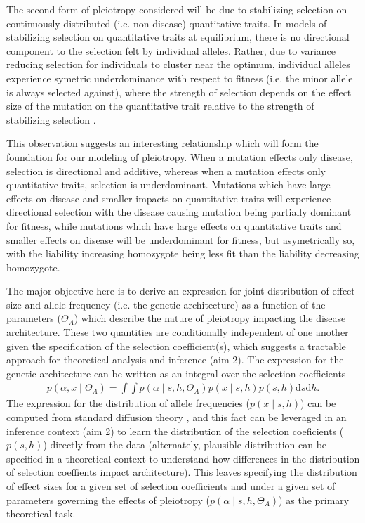 \documentclass[11pt]{article}
\begin{document}
The second form of pleiotropy considered will be due to stabilizing selection on continuously distributed (i.e. non-disease) quantitative traits. In models of stabilizing selection on quantitative traits at equilibrium, there is no directional component to the selection felt by individual alleles. Rather, due to variance reducing selection for individuals to cluster near the optimum, individual alleles experience symetric underdominance with respect to fitness (i.e. the minor allele is always selected against), where the strength of selection depends on the effect size of the mutation on the quantitative trait relative to the strength of stabilizing selection \cite{Robertson:1956dk}.

This observation suggests an interesting relationship which will form the foundation for our modeling of pleiotropy. When a mutation effects only disease, selection is directional and additive, whereas when a mutation effects only quantitative traits, selection is underdominant. Mutations which have large effects on disease and smaller impacts on quantitative traits will experience directional selection with the disease causing mutation being partially dominant for fitness, while mutations which have large effects on quantitative traits and smaller effects on disease will be underdominant for fitness, but asymetrically so, with the liability increasing homozygote being less fit than the liability decreasing homozygote.

The major objective here is to derive an expression for joint distribution of effect size and allele frequency (i.e. the genetic architecture) as a function of the parameters ($\Theta_A$) which describe the nature of pleiotropy impacting the disease architecture. These two quantities are conditionally independent of one another given the specification of the selection coefficient(s), which suggests a tractable approach for theoretical analysis and inference (aim 2). The expression for the genetic architecture can be written as an integral over the selection coefficients
\begin{align}
  p\left(\alpha,x \mid \Theta_A\right) = \int \int p\left(\alpha \mid s,h,\Theta_A\right) p\left(x \mid s,h \right) p\left(s,h\right)\mathrm{d}s \mathrm{d}h.
\end{align}
The expression for the distribution of allele frequencies ($p\left(x \mid s,h\right)$) can be computed from standard diffusion theory \cite{Ewens}, and this fact can be leveraged in an inference context (aim 2) to learn the distribution of the selection coeficients ($p\left(s,h\right)$) directly from the data (alternately, plausible distribution can be specified in a theoretical context to understand how differences in the distribution of selection coeffients impact architecture). This leaves specifying the distribution of effect sizes for a given set of selection coefficients and under a given set of parameters governing the effects of pleiotropy ($p\left(\alpha \mid s,h,\Theta_A\right)$) as the primary theoretical task.
\end{document}
